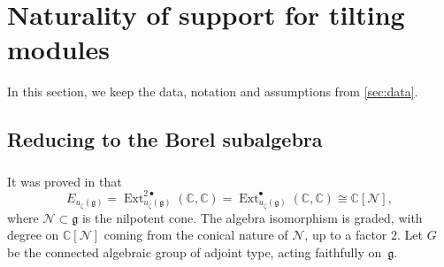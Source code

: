 \documentclass{amsart}
\numberwithin{equation}{section}
\theoremstyle{definition}
\theoremstyle{remark}
\newcommand{\cN}{\mathcal{N}}
\newcommand{\Ext}{\operatorname{Ext}}
\newcommand{\fg}{\mathfrak{g}}
\newcommand{\mC}{\mathbb{C}}
\begin{document}



\section{Naturality of support for tilting modules}\label{sec:Full}
In this section, we keep the data, notation and assumptions from \ref{sec:data}.

\subsection{Reducing to the Borel subalgebra}


\subsubsection{} It was proved in \cite{GK} that
\[E_{u_\zeta(\fg)}=\Ext^{2\bullet}_{u_\zeta(\fg)}(\mC,\mC)=\Ext^{\bullet}_{u_\zeta(\fg)}(\mC,\mC)\cong\mC[\cN],\]
where $\cN\subset\fg$ is the nilpotent cone. The algebra isomorphism is graded, with degree on $\mC[\cN]$ coming from the conical nature of $\cN$, up to a factor $2$. Let $G$ be the connected algebraic group of adjoint type, acting faithfully on~$\fg$. 
\end{document}
